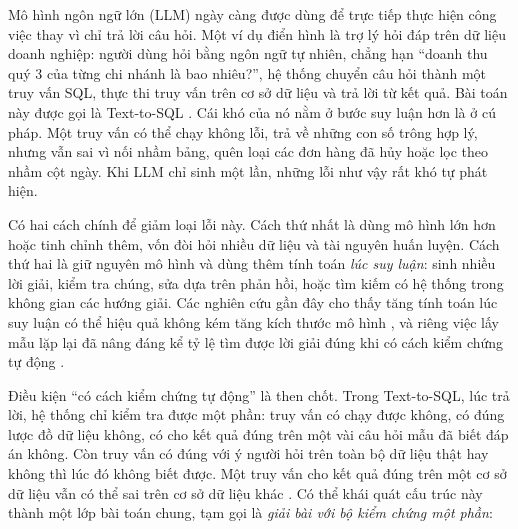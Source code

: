 

Mô hình ngôn ngữ lớn (LLM) ngày càng được dùng để trực tiếp thực hiện công việc thay vì chỉ trả lời câu hỏi. Một ví dụ điển hình là trợ lý hỏi đáp trên dữ liệu doanh nghiệp: người dùng hỏi bằng ngôn ngữ tự nhiên, chẳng hạn ``doanh thu quý 3 của từng chi nhánh là bao nhiêu?'', hệ thống chuyển câu hỏi thành một truy vấn SQL, thực thi truy vấn trên cơ sở dữ liệu và trả lời từ kết quả. Bài toán này được gọi là Text-to-SQL \cite{yu2018spider,li2023bird}. Cái khó của nó nằm ở bước suy luận hơn là ở cú pháp. Một truy vấn có thể chạy không lỗi, trả về những con số trông hợp lý, nhưng vẫn sai vì nối nhầm bảng, quên loại các đơn hàng đã hủy hoặc lọc theo nhầm cột ngày. Khi LLM chỉ sinh một lần, những lỗi như vậy rất khó tự phát hiện.

Có hai cách chính để giảm loại lỗi này. Cách thứ nhất là dùng mô hình lớn hơn hoặc tinh chỉnh thêm, vốn đòi hỏi nhiều dữ liệu và tài nguyên huấn luyện. Cách thứ hai là giữ nguyên mô hình và dùng thêm tính toán \emph{lúc suy luận}: sinh nhiều lời giải, kiểm tra chúng, sửa dựa trên phản hồi, hoặc tìm kiếm có hệ thống trong không gian các hướng giải. Các nghiên cứu gần đây cho thấy tăng tính toán lúc suy luận có thể hiệu quả không kém tăng kích thước mô hình \cite{snell2024scaling}, và riêng việc lấy mẫu lặp lại đã nâng đáng kể tỷ lệ tìm được lời giải đúng khi có cách kiểm chứng tự động \cite{brown2024monkeys}.

Điều kiện ``có cách kiểm chứng tự động'' là then chốt. Trong Text-to-SQL, lúc trả lời, hệ thống chỉ kiểm tra được một phần: truy vấn có chạy được không, có đúng lược đồ dữ liệu không, có cho kết quả đúng trên một vài câu hỏi mẫu đã biết đáp án không. Còn truy vấn có đúng với ý người hỏi trên toàn bộ dữ liệu thật hay không thì lúc đó không biết được. Một truy vấn cho kết quả đúng trên một cơ sở dữ liệu vẫn có thể sai trên cơ sở dữ liệu khác \cite{zhong2020testsuite}. Có thể khái quát cấu trúc này thành một lớp bài toán chung, tạm gọi là \emph{giải bài với bộ kiểm chứng một phần}:

